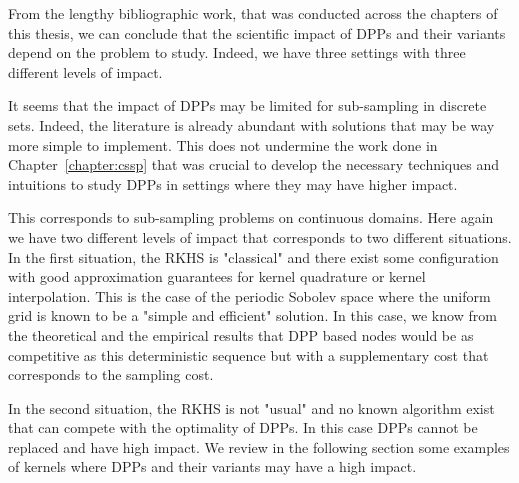 \documentclass[twoside,11pt]{book}
\numberwithin{theorem}{chapter}
\numberwithin{definition}{chapter}
\numberwithin{proposition}{chapter}
\numberwithin{corollary}{chapter}
\numberwithin{example}{chapter}
\numberwithin{lemma}{chapter}
\numberwithin{assumption}{chapter}
\numberwithin{equation}{chapter}
\numberwithin{figure}{chapter}
\begin{document}


From the lengthy bibliographic work, that was conducted across the chapters of this thesis, we can conclude that the scientific impact of DPPs and their variants depend on the problem to study. Indeed, we have three settings with three different levels of impact. 

It seems that the impact of DPPs may be limited for sub-sampling in discrete sets. Indeed, the literature is already abundant with solutions that may be way more simple to implement. This does not undermine the work done in Chapter~\ref{chapter:cssp} that was crucial to develop the necessary techniques and intuitions to study DPPs in  settings where they may have higher impact.

This corresponds to sub-sampling problems on continuous domains. Here again we have two different levels of impact that corresponds to two different situations. In the first situation, the RKHS is "classical" and there exist some configuration with good approximation guarantees for kernel quadrature or kernel interpolation. This is the case of 
the periodic Sobolev space where the uniform grid is known to be a "simple and efficient" solution. In this case, we know from the theoretical and the empirical results that DPP based nodes would be as competitive as this deterministic sequence but with a supplementary cost that corresponds to the sampling cost.


In the second situation, the RKHS is not "usual" and no known algorithm exist that can compete with the optimality of DPPs. In this case DPPs cannot be replaced and have high impact. We review in the following section some  examples of kernels where DPPs and their variants may have a high impact.






\end{document}

